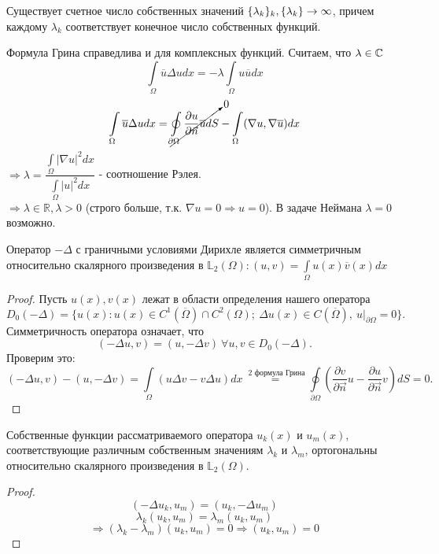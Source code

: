 \begin{statement}
Существует счетное число собственных значений $\{\lambda_k\}_k,  \\ \{\lambda_k\} \to \infty$, причем каждому $\lambda_k$ соответствует конечное число собственных функций.
\end{statement} 
Формула Грина справедлива и для комплексных функций. Считаем, что $\lambda \in \mathbb{C}$
$$
\int\limits_{\Omega} \overline{u} \Delta u dx = - \lambda \int\limits_{\Omega} u \overline{u} dx$$
$$
\int\limits_{\Omega} \overline{u} \Delta u dx = \cancelto{0}{\oint\limits_{\partial \Omega} \frac{\partial u}{\partial \vec{n}} \overline{u} dS }- \int\limits_{\Omega} (\nabla u, \nabla \overline{u}) dx$$
$\Rightarrow \lambda = \dfrac{\int\limits_{\Omega}|\nabla u|^2 dx}{\int\limits_{\Omega}|u|^2 dx}$ - соотношение Рэлея.\\
$\Rightarrow \lambda \in \mathbb{R}, \lambda >0 $ (строго больше, т.к. $\nabla u = 0 \Rightarrow u =0$). В задаче Неймана $\lambda = 0$ возможно.\\
\begin{statement} Оператор $-\Delta$ с граничными условиями Дирихле является симметричным относительно скалярного произведения в $\mathbb{L}_2(\Omega): (u,v) = \int\limits_{\Omega} u(x) \overline{v}(x)dx $ 
\end{statement}
\begin{proof}
Пусть $u(x), v(x)$ лежат в области  определения нашего оператора $$D_0(-\Delta) = \{u(x): u(x) \in C^1(\overline{\Omega}) \cap C^2(\Omega); \ \Delta u(x) \in C(\overline{\Omega}), \ u|_{\partial \Omega} = 0 \}.$$
Симметричность оператора означает, что $$(-\Delta u,v)=(u, -\Delta v) \ \forall u,v \in D_0(-\Delta).$$ Проверим это: $$ (-\Delta u,v) - (u, -\Delta v) = \int\limits_{\Omega} (u \Delta v- v \Delta u)dx \stackrel{\text{ 2 формула Грина}}{=} \oint \limits_{\partial \Omega} ( \frac{\partial v}{\partial \vec{n}}u - \frac{\partial u}{\partial \vec{n}}v) dS =0.$$
\end{proof}
\begin{statement} Собственные функции рассматриваемого оператора $u_k(x)$ и $u_m(x)$, соответствующие различным собственным значениям $\lambda_k$ и $\lambda_m$, ортогональны относительно скалярного произведения в $\mathbb{L}_2(\Omega)$.
\end{statement}
\begin{proof}
$$(-\Delta u_k, u_m) = (u_k, -\Delta u_m)$$ $$\lambda_k (u_k, u_m)=  \lambda_m (u_k, u_m)$$ $$\Rightarrow (\lambda_k - \lambda_m) (u_k, u_m) = 0 \Rightarrow (u_k, u_m) = 0 $$
\end{proof}
 
 